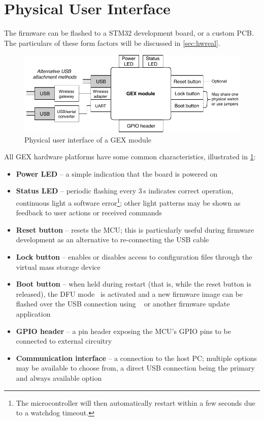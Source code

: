 \section{Physical User Interface}

The firmware can be flashed to a STM32 development board, or a custom \gls{PCB}. The particulars of these form factors will be discussed in \cref{sec:hwreal}.

\begin{figure}[h]
	\centering
	\includegraphics[scale=.95] {img/users-view.pdf}
	\caption{\label{fig:users_view_of_gex}Physical user interface of a GEX module}
\end{figure}

\noindent
All GEX hardware platforms have some common characteristics, illustrated in \cref{fig:users_view_of_gex}:

\begin{itemize}	
	\item \textbf{Power \gls{LED}} -- a simple indication that the board is powered on
	\item \textbf{Status \gls{LED}} -- periodic flashing every 3\,s indicates correct operation, continuous light a software error\footnote{The microcontroller will then automatically restart within a few seconds due to a watchdog timeout.}; other light patterns may be shown as feedback to user actions or received commands
	\item \textbf{Reset button} -- resets the \gls{MCU}; this is particularly useful during firmware development as an alternative to re-connecting the \gls{USB} cable
	\item \textbf{Lock button} -- enables or disables access to configuration files through the virtual mass storage device
	\item \textbf{Boot button} -- when held during restart (that is, while the reset button is released), the \gls{DFU} mode~\cite{usbif-dfu} is activated and a new firmware image can be flashed over the \gls{USB} connection using ~\cite{dfu-util} or another firmware update application
	\item \textbf{\gls{GPIO} header} -- a pin header exposing the \gls{MCU}'s \gls{GPIO} pins to be connected to external circuitry
	\item \textbf{Communication interface} -- a connection to the host \gls{PC}; multiple options may be available to choose from, a direct \gls{USB} connection being the primary and always available option
\end{itemize}

